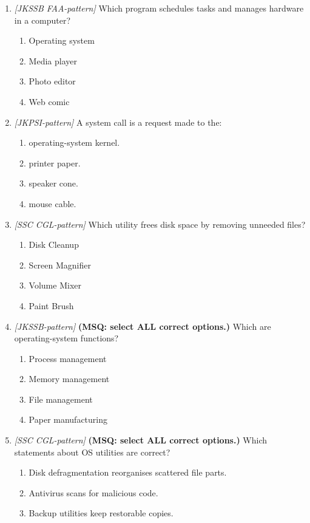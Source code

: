 \begin{enumerate}[label=\textbf{Q\arabic*.}, leftmargin=*]
\item \textit{[JKSSB FAA-pattern]} Which program schedules tasks and manages hardware in a computer?
  \begin{enumerate}[label=\Alph*.]
    \item Operating system
    \item Media player
    \item Photo editor
    \item Web comic
  \end{enumerate}
\item \textit{[JKPSI-pattern]} A system call is a request made to the:
  \begin{enumerate}[label=\Alph*.]
    \item operating-system kernel.
    \item printer paper.
    \item speaker cone.
    \item mouse cable.
  \end{enumerate}
\item \textit{[SSC CGL-pattern]} Which utility frees disk space by removing unneeded files?
  \begin{enumerate}[label=\Alph*.]
    \item Disk Cleanup
    \item Screen Magnifier
    \item Volume Mixer
    \item Paint Brush
  \end{enumerate}
\item \textit{[JKSSB-pattern]} \textbf{(MSQ: select ALL correct options.)} Which are operating-system functions?
  \begin{enumerate}[label=\Alph*.]
    \item Process management
    \item Memory management
    \item File management
    \item Paper manufacturing
  \end{enumerate}
\item \textit{[SSC CGL-pattern]} \textbf{(MSQ: select ALL correct options.)} Which statements about OS utilities are correct?
  \begin{enumerate}[label=\Alph*.]
    \item Disk defragmentation reorganises scattered file parts.
    \item Antivirus scans for malicious code.
    \item Backup utilities keep restorable copies.

\end{enumerate}
\end{enumerate}
